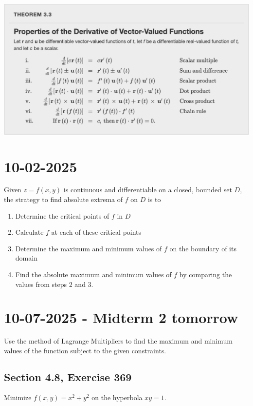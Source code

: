 \documentclass[]{mangos-musings}
\begin{document}
\begin{center}
  \includegraphics[scale=0.6]{assets/rec05-derivative-properties.png}
\end{center}


\newpage
\section*{10-02-2025}
Given $z = f(x, y)$ is continuous and differentiable on a closed, bounded set $D$, the strategy to find absolute extrema of $f$ on $D$ is to 
\begin{enumerate}
  \item Determine the critical points of $f$ in $D$
  \item Calculate $f$ at each of these critical points
  \item Determine the maximum and minimum values of $f$ on the boundary of its domain 
  \item Find the absolute maximum and minimum values of $f$ by comparing the values from steps 2 and 3.
\end{enumerate}




\newpage
\section*{10-07-2025 - Midterm 2 tomorrow}
Use the method of Lagrange Multipliers to find the maximum and minimum values of the function subject to the given constraints.
\subsection*{Section 4.8, Exercise 369}
Minimize $f(x, y) = x^2 + y^2$ on the hyperbola $xy = 1$.
\end{document}
